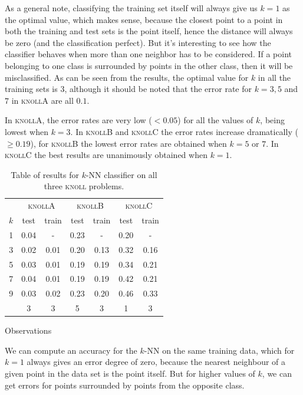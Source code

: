 \documentclass{article}
\newcommand{\knollA}{\textsc{knollA}\xspace}
\newcommand{\knollB}{\textsc{knollB}\xspace}
\newcommand{\knollC}{\textsc{knollC}\xspace}
\begin{document}
As a general note, classifying the training set itself will always
give us $k = 1$ as the optimal value, which makes sense, because the
closest point to a point in both the training and test sets is the
point itself, hence the distance will always be zero (and the
classification perfect). But it's interesting to see how the
classifier behaves when more than one neighbor has to be
considered. If a point belonging to one class is surrounded by points
in the other class, then it will be misclassified. As can be seen from
the results, the optimal value for $k$ in all the training sets is $3$,
although it should be noted that the error rate for $k = 3,5$ and $7$
in \knollA are all $0.1$.

In \knollA, the error rates are very low ($< 0.05$) for all the values of $k$,
being lowest when $k = 3$. In \knollB and \knollC the error rates
increase dramatically ($\geq 0.19$), for \knollB the lowest error rates are obtained
when $k = 5$ or $7$. In \knollC the best results are unanimously
obtained when $k = 1$.

\begin{table}
  \centering
  \begin{tabular}{c | c|c | c|c | c|c}
    \hfill & \multicolumn{2}{c|}{\knollA} & \multicolumn{2}{c|}{\knollB} & \multicolumn{2}{c}{\knollC}\\
    $k$ & test & train & test & train & test & train\\\hline
    1 & 0.04 &   -  & 0.23 &   -  & 0.20 &   - \\
    3 & 0.02 & 0.01 & 0.20 & 0.13 & 0.32 & 0.16\\
    5 & 0.03 & 0.01 & 0.19 & 0.19 & 0.34 & 0.21\\
    7 & 0.04 & 0.01 & 0.19 & 0.19 & 0.42 & 0.21\\
    9 & 0.03 & 0.02 & 0.23 & 0.20 & 0.46 & 0.33\\\hline\hline
    \hfill & 3 & 3  &   5  &   3  &   1  &   3 
  \end{tabular}
  \caption{Table of results for $k$-NN classifier on all three \textsc{knoll} problems.}
  \label{tbl:results1}
\end{table}

Observations

We can compute an accuracy for the $k$-NN on the same training data, which for $k = 1$ always gives an error degree of zero, because the nearest neighbour of a given point in the data set is the point itself. But for higher values of $k$, we can get errors for points surrounded by points from the opposite class.
\end{document}
